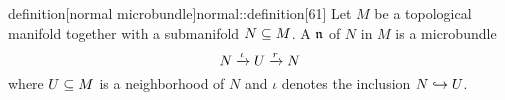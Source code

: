 \begin{mystatement}{definition}[normal microbundle]{normal::definition}[61]
    Let $M$ be a topological manifold together with a submanifold $N \subseteq{} M$.
    A  $\mathfrak{n}$ of $N$ in $M$ is a microbundle
    \[ N \xrightarrow{\iota} U \xrightarrow{r} N{} \]
    where $U \subseteq{} M$ is a neighborhood of $N$ and $\iota$ denotes the inclusion $N \hookrightarrow{} U$.
\end{mystatement}